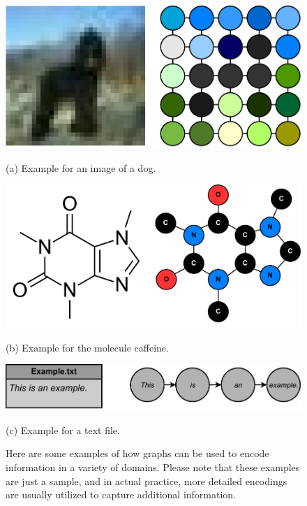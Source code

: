 \begin{figure}
 \centering
 \begin{minipage}[b]{0.475\textwidth}
 \centering
 \includegraphics[width=\textwidth]{Figures/Example_Encoding_Image.pdf}
 \caption*{(a) Example for an image of a dog.\footnotemark}
 \end{minipage}
 \hfill
 \begin{minipage}[b]{0.475\textwidth}
 \centering
 \includegraphics[width=\textwidth]{Figures/Example_Encoding_Molecule.pdf}
 \caption*{(b) Example for the molecule caffeine.\footnotemark}
 \end{minipage}
 \par\medskip
 \vspace{0.75cm}
 \centering
 \includegraphics[scale=.5]{Figures/Example_Encoding_Text.pdf}
 \caption*{(c) Example for a text file.}
 \hfill

 \caption[Caption for LOF]{Here are some examples of how graphs can be used to encode information in a variety of domains. Please note that these examples are just a sample, and in actual practice, more detailed encodings are usually utilized to capture additional information.\footnotemark}
 \label{fig:example_encodings}
\end{figure}


